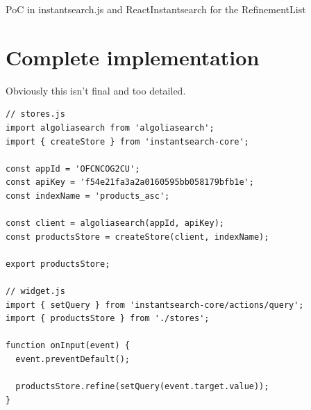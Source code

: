 PoC in instantsearch.js and ReactInstantsearch for the RefinementList %


\section{Complete implementation} %
\label{sec:complete_implementation}

Obviously this isn't final and too detailed.

\begin{lstlisting}[caption={Using instantsearch-core},label={lst:is-core-usage}]
// stores.js
import algoliasearch from 'algoliasearch';
import { createStore } from 'instantsearch-core';

const appId = 'OFCNCOG2CU';
const apiKey = 'f54e21fa3a2a0160595bb058179bfb1e';
const indexName = 'products_asc';

const client = algoliasearch(appId, apiKey);
const productsStore = createStore(client, indexName);

export productsStore;

// widget.js
import { setQuery } from 'instantsearch-core/actions/query';
import { productsStore } from './stores';

function onInput(event) {
  event.preventDefault();

  productsStore.refine(setQuery(event.target.value));
}
\end{lstlisting}


